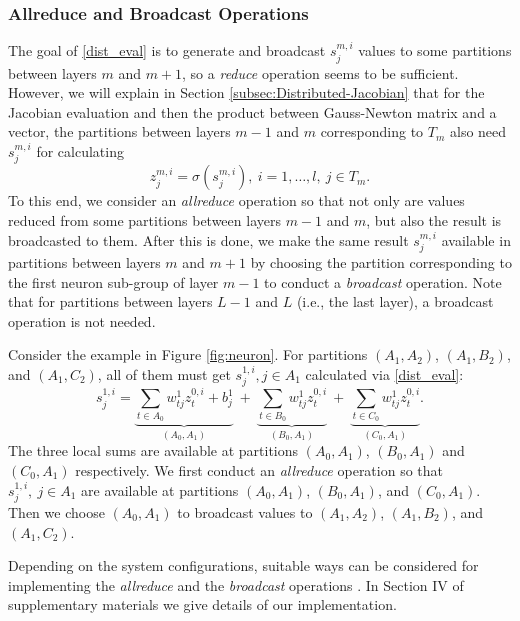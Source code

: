 \documentclass[12pt]{article}
\begin{document}
\subsubsection{Allreduce and Broadcast Operations}
\label{subsubsec:fun-allreduce}
The goal of \eqref{dist_eval} is to generate and broadcast $s^{m,i}_j$ values to some partitions between layers $m$ and $m+1$, so a {\it reduce} operation seems to be sufficient.
However, we will explain in Section \ref{subsec:Distributed-Jacobian} that for the Jacobian evaluation and then the product
between Gauss-Newton matrix and a vector, the partitions between layers $m-1$ and $m$ corresponding to $T_m$ also need $s^{m,i}_j$ for calculating
\begin{equation}
\label{dist-next}
z^{m,i}_j = \sigma(s^{m,i}_j),\ i=1,\ldots,l,\ j \in T_m.
\end{equation}
To this end, we consider an {\it allreduce} operation so that 
not only are values reduced from some partitions between layers $m-1$ and $m$, but also the result is broadcasted to them. 
After this is done, we make the same result $s^{m,i}_j$ available in partitions between layers $m$ and $m+1$ by choosing
the partition corresponding to the first neuron sub-group of layer $m-1$ to conduct a {\it broadcast} operation.
Note that for partitions between layers $L-1$ and $L$ (i.e., the last layer), a broadcast operation is not needed.
\par Consider the example in Figure \ref{fig:neuron}. For partitions $(A_1,A_2)$, $(A_1,B_2)$, and $(A_1,C_2)$, all of them must get $s^{1,i}_j, j \in A_1$ calculated via \eqref{dist_eval}:
\begin{equation}
s^{1,i}_j = \underbrace{\sum_{t\in A_0} w^1_{tj} z^{0,i}_t + b^1_j}_{(A_0,A_1)}\ +\ 
\underbrace{\sum_{t\in B_0} w^1_{tj} z^{0,i}_t}_{(B_0,A_1)}\ +\ 
\underbrace{\sum_{t\in C_0} w^1_{tj} z^{0,i}_t}_{(C_0,A_1)}.
\label{reduce-sum-eval}
\end{equation}
The three local sums are available at partitions $(A_0,A_1)$, $(B_0,A_1)$ and $(C_0,A_1)$ respectively.
We first conduct an {\it allreduce} operation so that $s^{1,i}_j,\ j \in A_1$ are available at partitions $(A_0,A_1)$, $(B_0,A_1)$, and $(C_0,A_1)$. 
Then we choose $(A_0,A_1)$ to broadcast values to $(A_1,A_2)$, $(A_1,B_2)$, and $(A_1,C_2)$. 

\par Depending on the system configurations, suitable ways
can be considered for implementing the {\it allreduce} and 
the {\it broadcast} operations \citep{RT05a}.
In Section IV of supplementary materials we give details of our implementation.
\end{document}

